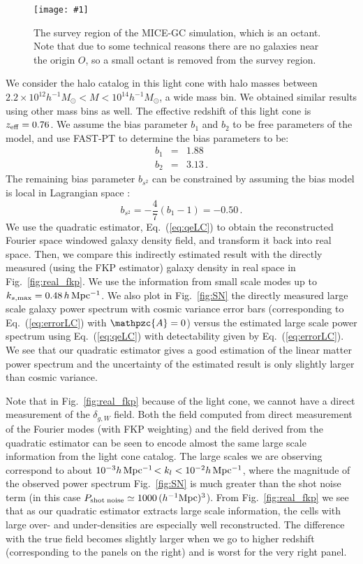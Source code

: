 \documentclass[prd,amsmath,amssymb,floatfix,superscriptaddress,nofootinbib,twocolumn]{revtex4-1}
\def\be{\begin{equation}}
\def\ee{\end{equation}}
\def\bea{\begin{eqnarray}}
\def\eea{\end{eqnarray}}
\newcommand{\vs}{\nonumber\\}
\newcommand{\ec}[1]{Eq.~(\ref{eq:#1})}
\newcommand{\rf}[1]{\ref{fig:#1}}
\newcommand{\sfig}[2]{
\texttt{[image: \#1]}
        }
\newcommand{\Sfig}[2]{
   \begin{figure}[thbp]
   \begin{center}
    \sfig{#1.pdf}{\columnwidth}
    \caption{{\small #2}}
    \label{fig:#1}
     \end{center}
   \end{figure}
}
\begin{document}
\Sfig{octant}{The survey region of the MICE-GC simulation, which is an octant. Note that due to some technical reasons there are no galaxies near the origin $O$, so a small octant is removed from the survey region.}

We consider the halo catalog in this light cone with halo masses between $2.2\times 10^{12}h^{-1}M_{\odot}<M<10^{14}h^{-1}M_{\odot}$, a wide mass bin. We obtained similar results using other mass bins as well. The effective redshift of this light cone is $z_{\rm eff}=0.76$. We assume the bias parameter $b_{1}$ and $b_{2}$ to be free parameters of the model, and use FAST-PT \cite{McEwen:2016fjn} to determine the bias parameters to be:
\bea 
b_1&=&1.88\vs
b_2&=&3.13\,.
\eea
The remaining bias parameter $b_{s^2}$ can be constrained by assuming the bias model is local in Lagrangian space \cite{Baldauf:2012hs}:
\be 
b_{s^2}=-\frac{4}{7}(b_1-1)=-0.50\,.
\ee 
We use the quadratic estimator, \ec{qeLC} to obtain the reconstructed Fourier space windowed galaxy density field, and transform it back into real space. Then, we compare this indirectly estimated result with the directly measured (using the FKP estimator) galaxy density in real space in Fig.~\rf{real_fkp}. We use the information from small scale modes up to $k_{s,\rm max}=0.48\,h\,\rm Mpc^{-1}$. We also plot in Fig.~\rf{SN} the directly measured large scale galaxy power spectrum with cosmic variance error bars (corresponding to \ec{errorLC} with $\mathpzc{A}=0$) versus the estimated large scale power spectrum using \ec{qeLC} with detectability given by \ec{errorLC}. We see that our quadratic estimator gives a good estimation of the linear matter power spectrum and the uncertainty of the estimated
result is only slightly larger than cosmic variance.

Note that in Fig.~\rf{real_fkp} because of the light cone, we
cannot have a direct measurement of the
$\delta_{g,W}$ field.  Both the field computed
from direct measurement of the Fourier modes (with FKP weighting) and
the field derived from the quadratic estimator
can be seen to encode almost the same large
 scale information from the light cone catalog. The large scales we
 are observing correspond to about $10^{-3}h\,\rm Mpc^{-1}$$<k_l<10^{-2}h\,\rm
 Mpc^{-1}$, where the magnitude of the observed power spectrum
 Fig.~\rf{SN} is much greater than the shot noise term  (in this
 case $P_{\rm shot \; noise}\simeq 1000\,(h^{-1}\rm Mpc)^3$). From
 Fig.~\rf{real_fkp} we see that as our quadratic estimator  extracts
 large scale information, the cells with  large over- and
 under-densities are especially well reconstructed. The difference
 with the true field becomes
 slightly larger when we go to higher redshift (corresponding to the
 panels on the right) and is worst for the very right panel.
 
\end{document}
